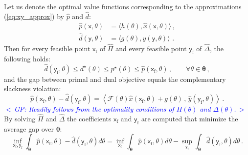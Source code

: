 \documentclass{article}
\newcommand{\commentGP}[1]{\noindent \textcolor{blue}{\emph{$<\,$GP: #1$\,>$}}}%
\newcommand{\opt}{\star}                    %
\newcommand{\feas}{\mathrm{f}}              %
\newcommand{\ppar}{\theta}                          %
\newcommand{\Ppar}{{\bm{\theta}}}                   %
\newcommand{\calF}{\mathcal{F}}                     %
\newcommand{\cx}{\textsf{x}}        %
\newcommand{\cy}{\textsf{y}}        %
\begin{document}
Let us denote the optimal value functions corresponding to the approximations (\ref{eq:xy_approx}) by $\hat{p}$ and $\hat{d}$:
\begin{align*}
\hat{p}(\cx,\ppar) &= \langle h(\ppar), \hat{x}(\cx,\ppar) \rangle \,,\\%
\hat{d}(\cy,\ppar) &= \langle g(\ppar), \hat{y}(\cy,\ppar) \rangle \,  \,.%
\end{align*}
Then for every feasible point $\cx_\feas$ of $\hat{\Pi}$ and every feasible point $\cy_\feas$ of $\hat{\Delta}$, the following holds:
\[ \hat{d}(\cy_\feas,\ppar) \leq d^\opt(\ppar) \leq p^\opt(\ppar) \leq \hat{p}(\cx_\feas,\ppar)\,,\qquad\forall\ppar\in\Ppar\,,%
\]
and the gap between primal and dual objective equals the complementary slackness violation:
\[ \hat{p}(\cx_\feas,\ppar) - \hat{d}(\cy_\feas,\ppar) = \left\langle \calF(\ppar) \hat{x}(\cx_\feas,\ppar) + g(\ppar) \,,\, \hat{y}(\cy_\feas,\ppar) \right\rangle \,.%
\]
\commentGP{Readily follows from the optimality conditions of $\Pi(\ppar)$ and $\Delta(\ppar)$.} By solving $\hat{\Pi}$ and $\hat{\Delta}$ the coefficients $\cx_\feas$ and $\cy_\feas$ are computed that minimize the average gap over $\Ppar$:
\[ \inf_{\cx_\feas,\cy_\feas} \int_{\Ppar} \hat{p}(\cx_\feas,\ppar) - \hat{d}(\cy_\feas,\ppar) d\ppar = %
   \inf_{\cx_\feas} \int_{\Ppar} \hat{p}(\cx_\feas,\ppar) d\ppar - \sup_{\cy_\feas} \int_{\Ppar} \hat{d}(\cy_\feas,\ppar) d\ppar\,.%
\]
\end{document}
